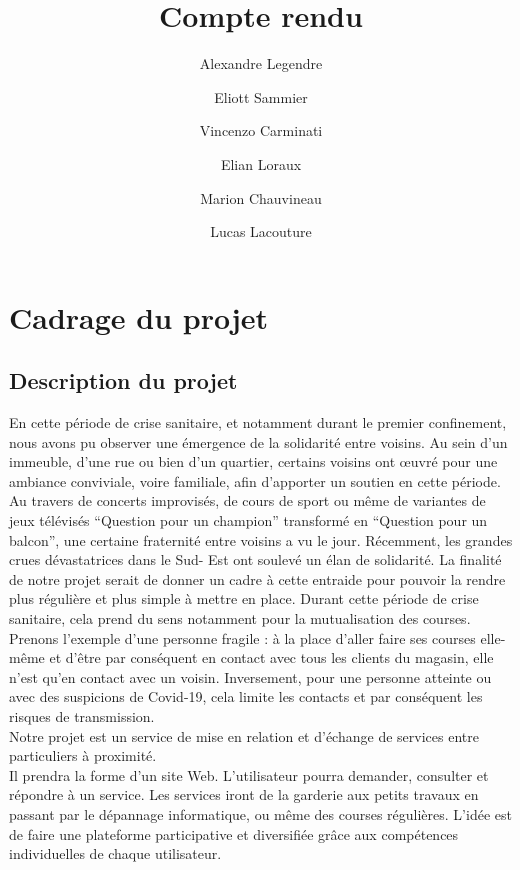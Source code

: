 \documentclass[a4paper,11pt]{article}
\title{Compte rendu}
\author{
  Alexandre Legendre\\
  \and
  Eliott Sammier\\
  \and
  Vincenzo Carminati\\
  \and
  Elian Loraux\\
  \and
  Marion Chauvineau\\
  \and
  Lucas Lacouture\\
}
\begin{document}
\newpage
\tableofcontents
\newpage


\section{Cadrage du projet}


\subsection{Description du projet}
En cette période de crise sanitaire, et notamment durant le premier confinement, nous avons pu observer une
émergence de la solidarité entre voisins. Au sein d’un immeuble, d’une rue ou bien d’un quartier,
certains voisins ont œuvré pour une ambiance conviviale, voire familiale, afin d’apporter un soutien en
cette période. Au travers de concerts improvisés, de cours de sport ou même de variantes de jeux
télévisés “Question pour un champion” transformé en “Question pour un balcon”,
une certaine fraternité entre voisins a vu le jour. Récemment, les grandes crues dévastatrices dans le Sud-
Est ont soulevé un élan de solidarité. La finalité de notre projet serait de donner un cadre à cette
entraide pour pouvoir la rendre plus régulière et plus simple à mettre en place.
Durant cette période de crise sanitaire, cela prend du sens notamment pour la mutualisation des
courses. Prenons l’exemple d’une personne fragile : à la place d’aller faire ses courses elle-même et
d’être par conséquent en contact avec tous les clients du magasin, elle n’est qu’en contact avec un
voisin. Inversement, pour une personne atteinte ou avec des suspicions de Covid-19, cela limite les
contacts et par conséquent les risques de transmission.\\

Notre projet est un service de mise en relation et d’échange de services entre particuliers à proximité.\\

Il prendra la forme d’un site Web. L’utilisateur pourra demander, consulter et répondre à un service.
Les services iront de la garderie aux petits travaux en passant par le dépannage informatique, ou
même des courses régulières. L’idée est de faire une plateforme participative et diversifiée grâce aux
compétences individuelles de chaque utilisateur.\\
\end{document}
